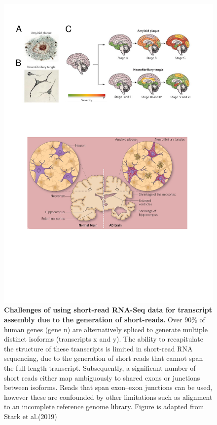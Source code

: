 \begin{landscape}
	\begin{figure}[htp]
		\centering
		\includegraphics[page=10,trim={0 19cm 2cm 1cm},clip, scale = 1]{Figures/Introduction_Figures.pdf}
		\captionsetup{width=1.2\textwidth}
		\caption[Challenges of using short-read RNA-Seq data for transcriptome profiling studies]%
		{\textbf{Challenges of using short-read RNA-Seq data for transcript assembly due to the generation of short-reads.} Over 90\% of human genes (gene n) are alternatively spliced to generate multiple distinct isoforms (transcripts x and y). The ability to recapitulate the structure of these transcripts is limited in short-read RNA sequencing, due to the generation of short reads that cannot span the full-length transcript. Subsequently, a significant number of short reads either map ambiguously to shared exons or junctions between isoforms. Reads that span exon–exon junctions can be used, however these are confounded by other limitations such as alignment to an incomplete reference genome library. Figure is adapted from Stark et al.(2019) \cite{Stark2019}}
		\label{fig:rna_seq_limitations}
	\end{figure}
\end{landscape}


